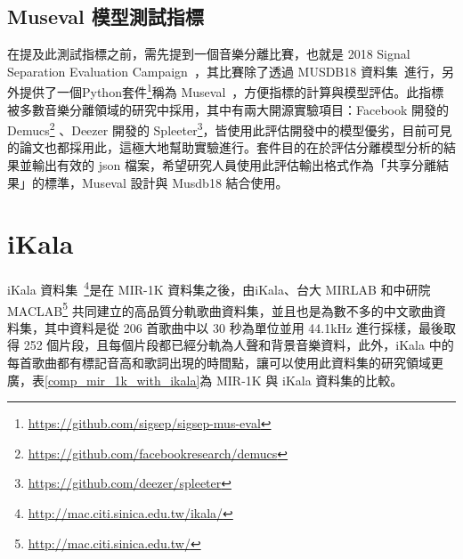 \subsection{Museval 模型測試指標}
在提及此測試指標之前，需先提到一個音樂分離比賽，也就是 2018 Signal Separation Evaluation Campaign~\cite{stoter20182018}，其比賽除了透過 MUSDB18 資料集~\cite{rafii2017musdb18,musdb18}進行，另外提供了一個Python套件\footnote{\url{https://github.com/sigsep/sigsep-mus-eval}}稱為 Museval~\cite{stoter2018museval}，方便指標的計算與模型評估。此指標被多數音樂分離領域的研究中採用，其中有兩大開源實驗項目：Facebook 開發的 Demucs\footnote{\url{https://github.com/facebookresearch/demucs}} 、Deezer 開發的 Spleeter\footnote{\url{https://github.com/deezer/spleeter}}，皆使用此評估開發中的模型優劣，目前可見的論文也都採用此，這極大地幫助實驗進行。套件目的在於評估分離模型分析的結果並輸出有效的 json 檔案，希望研究人員使用此評估輸出格式作為「共享分離結果」的標準，Museval 設計與 Musdb18 結合使用。


\section{iKala}
iKala 資料集~\cite{chan2015vocal}\footnote{\url{http://mac.citi.sinica.edu.tw/ikala/}}是在 MIR-1K 資料集之後，由iKala、台大 MIRLAB 和中研院 MACLAB\footnote{\url{http://mac.citi.sinica.edu.tw/}} 共同建立的高品質分軌歌曲資料集，並且也是為數不多的中文歌曲資料集，其中資料是從 206 首歌曲中以 30 秒為單位並用 44.1kHz 進行採樣，最後取得 252 個片段，且每個片段都已經分軌為人聲和背景音樂資料，此外，iKala 中的每首歌曲都有標記音高和歌詞出現的時間點，讓可以使用此資料集的研究領域更廣，表\ref{comp_mir_1k_with_ikala}為 MIR-1K 與 iKala 資料集的比較。

